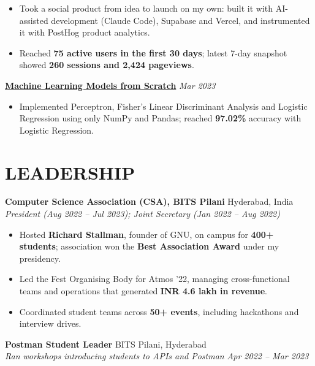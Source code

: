 \documentclass[a4paper,10pt]{extarticle}
\newcommand{\resumeSubheading}[4]{%
    \textbf{#1} \hfill #2\\
    \textit{#3} \hfill \textit{#4}}
\newcommand{\projectHeading}[2]{\textbf{#1} \hfill \textit{#2}}
\begin{document}
\begin{itemize}
    \item Took a social product from idea to launch on my own: built it with AI-assisted development
    (Claude Code), Supabase and Vercel, and instrumented it with PostHog product analytics.

    \item Reached \textbf{75 active users in the first 30 days}; latest 7-day snapshot showed
    \textbf{260 sessions and 2,424 pageviews}. %
\end{itemize}

\vspace{3pt}
\projectHeading
{\href{https://github.com/shivansh-13/ML-models-LR-Percptron-FLDA}{Machine Learning Models from Scratch}}
{Mar 2023}

\begin{itemize}
    \item Implemented Perceptron, Fisher's Linear Discriminant Analysis and Logistic Regression using
    only NumPy and Pandas; reached \textbf{97.02\%} accuracy with Logistic Regression.
\end{itemize}

\section*{LEADERSHIP}

\resumeSubheading
{Computer Science Association (CSA), BITS Pilani}
{Hyderabad, India}
{President (Aug 2022 -- Jul 2023); Joint Secretary (Jan 2022 -- Aug 2022)}
{}

\begin{itemize}
    \item Hosted \textbf{Richard Stallman}, founder of GNU, on campus for \textbf{400+ students};
    association won the \textbf{Best Association Award} under my presidency.

    \item Led the Fest Organising Body for Atmos '22, managing cross-functional teams and operations that
    generated \textbf{INR 4.6 lakh in revenue}.

    \item Coordinated student teams across \textbf{50+ events}, including hackathons and interview drives.
\end{itemize}

\vspace{3pt}
\resumeSubheading
{Postman Student Leader}
{BITS Pilani, Hyderabad}
{Ran workshops introducing students to APIs and Postman}
{Apr 2022 -- Mar 2023}
\end{document}
